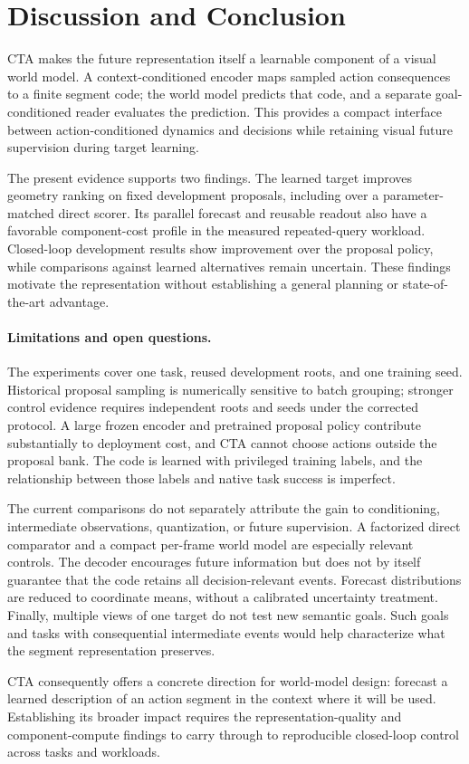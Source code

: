 \section{Discussion and Conclusion}
\label{sec:discussion}
CTA makes the future representation itself a learnable component of a visual world model. A context-conditioned encoder maps sampled action consequences to a finite segment code; the world model predicts that code, and a separate goal-conditioned reader evaluates the prediction. This provides a compact interface between action-conditioned dynamics and decisions while retaining visual future supervision during target learning.

The present evidence supports two findings. The learned target improves geometry ranking on fixed development proposals, including over a parameter-matched direct scorer. Its parallel forecast and reusable readout also have a favorable component-cost profile in the measured repeated-query workload. Closed-loop development results show improvement over the proposal policy, while comparisons against learned alternatives remain uncertain. These findings motivate the representation without establishing a general planning or state-of-the-art advantage.

\paragraph{Limitations and open questions.}
The experiments cover one task, reused development roots, and one training seed. Historical proposal sampling is numerically sensitive to batch grouping; stronger control evidence requires independent roots and seeds under the corrected protocol. A large frozen encoder and pretrained proposal policy contribute substantially to deployment cost, and CTA cannot choose actions outside the proposal bank. The code is learned with privileged training labels, and the relationship between those labels and native task success is imperfect.

The current comparisons do not separately attribute the gain to conditioning, intermediate observations, quantization, or future supervision. A factorized direct comparator and a compact per-frame world model are especially relevant controls. The decoder encourages future information but does not by itself guarantee that the code retains all decision-relevant events. Forecast distributions are reduced to coordinate means, without a calibrated uncertainty treatment. Finally, multiple views of one target do not test new semantic goals. Such goals and tasks with consequential intermediate events would help characterize what the segment representation preserves.

CTA consequently offers a concrete direction for world-model design: forecast a learned description of an action segment in the context where it will be used. Establishing its broader impact requires the representation-quality and component-compute findings to carry through to reproducible closed-loop control across tasks and workloads.
